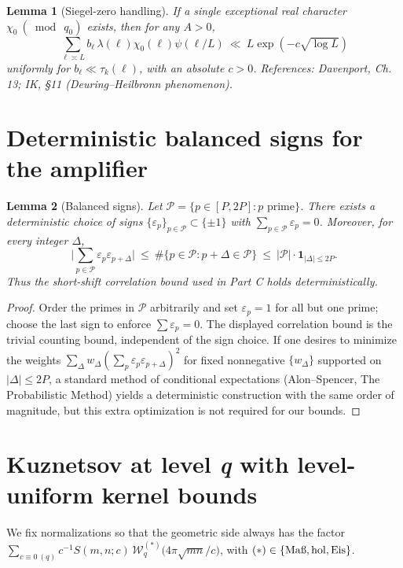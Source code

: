 \documentclass[11pt]{article}
\newtheorem{lemma}{Lemma}[part]
\theoremstyle{definition}
\theoremstyle{remark}
\numberwithin{equation}{part}
\begin{document}
\begin{lemma}[Siegel-zero handling]\label{lem:siegel}
	If a single exceptional real character $\chi_0\ (\bmod\ q_0)$ exists, then for any $A>0$,
	\[
		\sum_{\ell\asymp L} b_\ell\,\lambda(\ell)\chi_0(\ell)\psi(\ell/L)\ \ll\ L\exp(-c\sqrt{\log L})
	\]
	uniformly for $b_\ell\ll \tau_k(\ell)$, with an absolute $c>0$. References: Davenport, Ch. 13; IK, §11 (Deuring--Heilbronn phenomenon).
\end{lemma}

\section{Deterministic balanced signs for the amplifier}

\begin{lemma}[Balanced signs]\label{lem:balanced-signs}
	Let $\mathcal P=\{p\in[P,2P]: p\text{ prime}\}$. There exists a deterministic choice of signs $\{\varepsilon_p\}_{p\in\mathcal P}\subset\{\pm 1\}$ with $\sum_{p\in\mathcal P}\varepsilon_p=0$. Moreover, for every integer $\Delta$,
	\[
		\Big|\sum_{p\in\mathcal P}\varepsilon_p\varepsilon_{p+\Delta}\Big|\ \le\ \#\{p\in\mathcal P: p+\Delta\in\mathcal P\}\ \le\ |\mathcal P|\cdot \mathbf 1_{|\Delta|\le 2P}.
	\]
	Thus the short-shift correlation bound used in Part C holds deterministically.
\end{lemma}

\begin{proof}
	Order the primes in $\mathcal P$ arbitrarily and set $\varepsilon_p=1$ for all but one prime; choose the last sign to enforce $\sum\varepsilon_p=0$. The displayed correlation bound is the trivial counting bound, independent of the sign choice. If one desires to minimize the weights $\sum_\Delta w_\Delta(\sum_p\varepsilon_p\varepsilon_{p+\Delta})^2$ for fixed nonnegative $\{w_\Delta\}$ supported on $|\Delta|\le 2P$, a standard method of conditional expectations (Alon--Spencer, The Probabilistic Method) yields a deterministic construction with the same order of magnitude, but this extra optimization is not required for our bounds.
\end{proof}

\bigskip

\section{Kuznetsov at level \textit{q} with level-uniform kernel bounds}

We fix normalizations so that the geometric side always has the factor
$\sum_{c\equiv 0\ (q)} c^{-1} S(m,n;c)\,\mathcal W^{(*)}_{q}\!\big(4\pi\sqrt{mn}/c\big)$,
with $(*)\in\{\mathrm{Ma\text\ss},\mathrm{hol},\mathrm{Eis}\}$.
\end{document}
